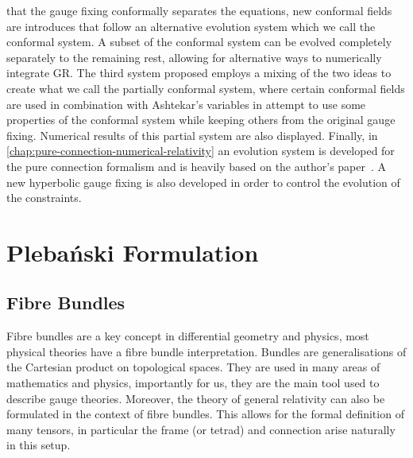 \documentclass[10pt]{report}
\newcommand{\pleb}[0]{Pleba\'nski}
\theoremstyle{definition}
\begin{document}
that the gauge fixing conformally separates the equations, new conformal fields are introduces that follow an alternative evolution system which we call the conformal system. A subset of the conformal system can be evolved completely separately to the remaining rest, allowing for alternative ways to numerically integrate GR. The third system proposed employs a mixing of the two ideas to create what we call the partially conformal system, where certain conformal fields are used in combination with Ashtekar's variables in attempt to use some properties of the conformal system while keeping others from the original gauge fixing. Numerical results of this partial system are also displayed. Finally, in \cref{chap:pure-connection-numerical-relativity} an evolution system is developed for the pure connection formalism and is heavily based on the author's paper~\cite{WeylCurvatureKrasno2022}. A new hyperbolic gauge fixing is also developed in order to control the evolution of the constraints.


    \newpage
    \part{\pleb{} Formulation}\label{part:pleb-formulation}
    
    \newpage
\chapter{Fibre Bundles}\label{chap:fibre-bundles}
Fibre bundles are a key concept in differential geometry and physics, most physical theories have a fibre bundle interpretation. Bundles are generalisations of the Cartesian product on topological spaces. They are used in many areas of mathematics and physics, importantly for us, they are the main tool used to describe gauge theories. Moreover, the theory of general relativity can also be formulated in the context of fibre bundles. This allows for the formal definition of many tensors, in particular the frame (or tetrad) and connection arise naturally in this setup.
\end{document}
